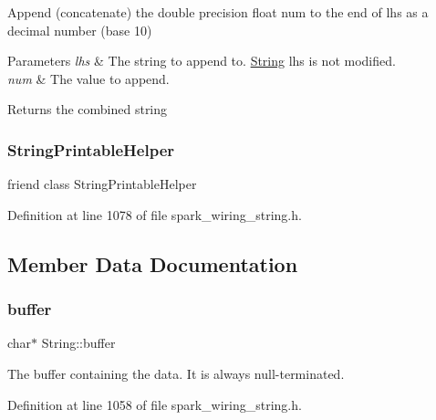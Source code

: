 Append (concatenate) the double precision float num to the end of lhs as a decimal number (base 10) 


\begin{DoxyParams}{Parameters}
{\em lhs} & The string to append to. \hyperlink{class_string}{String} lhs is not modified.\\
\hline
{\em num} & The value to append.\\
\hline
\end{DoxyParams}
\begin{DoxyReturn}{Returns}
the combined string 
\end{DoxyReturn}
\mbox{\label{class_string_a5e68bdc5e2e049ec2703293759e6049a}} 
\subsubsection{\texorpdfstring{String\+Printable\+Helper}{StringPrintableHelper}}
{\footnotesize\ttfamily friend class String\+Printable\+Helper\hspace{0.3cm}{\ttfamily [friend]}}



Definition at line 1078 of file spark\+\_\+wiring\+\_\+string.\+h.



\subsection{Member Data Documentation}
\mbox{\label{class_string_a7892a52a08b6671add931f85a19c1d46}} 
\subsubsection{\texorpdfstring{buffer}{buffer}}
{\footnotesize\ttfamily char$\ast$ String\+::buffer\hspace{0.3cm}{\ttfamily [protected]}}



The buffer containing the data. It is always null-\/terminated. 



Definition at line 1058 of file spark\+\_\+wiring\+\_\+string.\+h.



